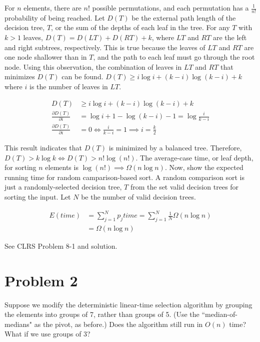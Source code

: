 \documentclass[10pt]{article}
\begin{document}
For $n$ elements, there are $n!$ possible permutations, and each permutation has a $\frac{1}{n!}$ probability of being reached. Let $D(T)$ be the external path length of the decision tree, $T$, or the sum of the depths of each leaf in the tree. For any $T$ with $k > 1$ leaves, $D(T) = D(LT) + D(RT) + k$, where $LT$ and $RT$ are the left and right subtrees, respectively. This is true because the leaves of $LT$ and $RT$ are one node shallower than in $T$, and the path to each leaf must go through the root node. Using this observation, the combination of leaves in $LT$ and $RT$ that minimizes $D(T)$ can be found. $D(T) \geq i \log i + (k - i) \log (k - i) + k$ where $i$ is the number of leaves in $LT$.

\begin{align*}
	D(T) &\geq i \log i + (k - i) \log (k - i) + k \\
	\frac{\partial D(T)}{\partial i} &= \log i + 1 - \log(k - i) - 1 = \log \frac{i}{k - i} \\
	\frac{\partial D(T)}{\partial i} &= 0 \iff \frac{i}{k - i} = 1 \implies i = \frac{k}{2}
\end{align*}

This result indicates that $D(T)$ is minimized by a balanced tree. Therefore, $D(T) > k \log k \iff D(T) > n! \log (n!)$. The average-case time, or leaf depth, for sorting $n$ elements is $\log(n!) \implies \Omega(n \log n)$. Now, show the expected running time for random camparison-based sort. A random comparison sort is just a randomly-selected decision tree, $T$ from the set valid decision trees for sorting the input. Let $N$ be the number of valid decision trees.

\begin{align*}
	E(time) &= \sum_{j = 1}^{N} p_j time = \sum_{j = 1}^{N} \frac{1}{N} \Omega(n \log n) \\
	&= \Omega(n \log n)
\end{align*}

\smallskip

See CLRS Problem 8-1 and solution.

\section*{\normalsize Problem 2}

Suppose we modify the deterministic linear-time selection algorithm by grouping the elements into groups of 7, rather than groups of 5. (Use the ``median-of-medians" as the pivot, as before.) Does the algorithm still run in $O(n)$ time? What if we use groups of 3?
\bigskip
\end{document}
